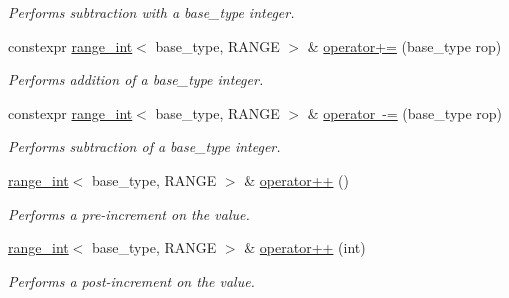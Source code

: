 \begin{DoxyCompactItemize}
\begin{DoxyCompactList}\small\item\em Performs subtraction with a base\+\_\+type integer. \end{DoxyCompactList}\item 
\mbox{\label{classfsl_1_1lg_1_1range__int_ac16244bf164bdfb057a40d8a99216471}} 
constexpr \mbox{\hyperlink{classfsl_1_1lg_1_1range__int}{range\+\_\+int}}$<$ base\+\_\+type, R\+A\+N\+GE $>$ \& \mbox{\hyperlink{classfsl_1_1lg_1_1range__int_ac16244bf164bdfb057a40d8a99216471}{operator+=}} (base\+\_\+type rop)
\begin{DoxyCompactList}\small\item\em Performs addition of a base\+\_\+type integer. \end{DoxyCompactList}\item 
\mbox{\label{classfsl_1_1lg_1_1range__int_a09ff003e409df860716d0b4047333bc1}} 
constexpr \mbox{\hyperlink{classfsl_1_1lg_1_1range__int}{range\+\_\+int}}$<$ base\+\_\+type, R\+A\+N\+GE $>$ \& \mbox{\hyperlink{classfsl_1_1lg_1_1range__int_a09ff003e409df860716d0b4047333bc1}{operator -\/=}} (base\+\_\+type rop)
\begin{DoxyCompactList}\small\item\em Performs subtraction of a base\+\_\+type integer. \end{DoxyCompactList}\item 
\mbox{\label{classfsl_1_1lg_1_1range__int_a74f4ece070503ea06f142c749288bdbb}} 
\mbox{\hyperlink{classfsl_1_1lg_1_1range__int}{range\+\_\+int}}$<$ base\+\_\+type, R\+A\+N\+GE $>$ \& \mbox{\hyperlink{classfsl_1_1lg_1_1range__int_a74f4ece070503ea06f142c749288bdbb}{operator++}} ()
\begin{DoxyCompactList}\small\item\em Performs a pre-\/increment on the value. \end{DoxyCompactList}\item 
\mbox{\label{classfsl_1_1lg_1_1range__int_ace5dc0fa6bf4940173c1557357d36387}} 
\mbox{\hyperlink{classfsl_1_1lg_1_1range__int}{range\+\_\+int}}$<$ base\+\_\+type, R\+A\+N\+GE $>$ \& \mbox{\hyperlink{classfsl_1_1lg_1_1range__int_ace5dc0fa6bf4940173c1557357d36387}{operator++}} (int)
\begin{DoxyCompactList}\small\item\em Performs a post-\/increment on the value. \end{DoxyCompactList}\item 

\end{DoxyCompactItemize}
